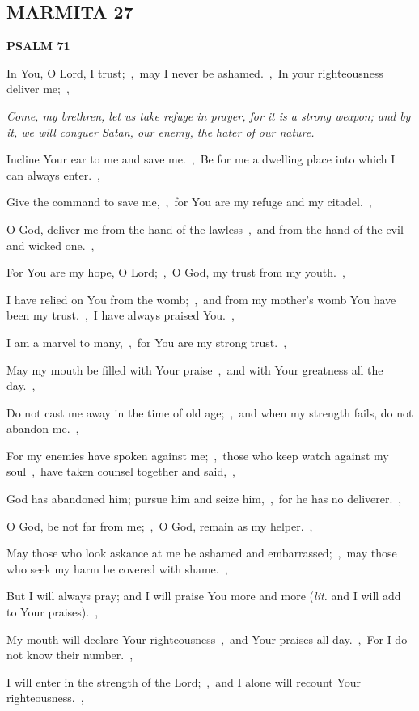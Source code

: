 \documentclass[12pt,twoside,a5paper]{article}
\newcommand{\marmita}[1]{\subsection*{MARMITA {#1}}}
\newcommand{\psalm}[1]{\textbf{PSALM {#1}}\nopagebreak}
\newcommand{\qanona}[1]{{\liturgicalhint{Qanona.} \emph{#1}}}
\newcommand{\translationliteral}[1]{\emph{lit.} #1}
\begin{document}
\marmita{27}

\psalm{71}

\begin{normalparskip}
  In You, O Lord, I trust;~\sep\ may I never be ashamed.~\sep\ In your righteousness deliver me;~\sep

  \qanona{Come, my brethren, let us take refuge in prayer, for it is a strong weapon; and by it, we will conquer Satan, our enemy, the hater of our nature.}

  Incline Your ear to me and save me.~\sep\ Be for me a dwelling place into which I can always enter.~\sep

  Give the command to save me,~\sep\ for You are my refuge and my citadel.~\sep

  O God, deliver me from the hand of the lawless~\sep\ and from the hand of the evil and wicked one.~\sep

  For You are my hope, O Lord;~\sep\ O God, my trust from my youth.~\sep

  I have relied on You from the womb;~\sep\ and from my mother's womb You have been my trust.~\sep\ I have always praised You.~\sep

  I am a marvel to many,~\sep\ for You are my strong trust.~\sep

  May my mouth be filled with Your praise~\sep\ and with Your greatness all the day.~\sep

  Do not cast me away in the time of old age;~\sep\ and when my strength fails, do not abandon me.~\sep

  For my enemies have spoken against me;~\sep\ those who keep watch against my soul~\sep\ have taken counsel together and said,~\sep

  God has abandoned him; pursue him and seize him,~\sep\ for he has no deliverer.~\sep

  O God, be not far from me;~\sep\ O God, remain as my helper.~\sep

  May those who look askance at me be ashamed and embarrassed;~\sep\ may those who seek my harm be covered with shame.~\sep

  But I will always pray; and I will praise You more and more (\translationliteral{and I will add to Your praises}).~\sep

  My mouth will declare Your righteousness~\sep\ and Your praises all day.~\sep\ For I do not know their number.~\sep

  I will enter in the strength of the Lord;~\sep\ and I alone will recount Your righteousness.~\sep


\end{normalparskip}
\end{document}
